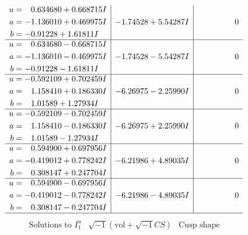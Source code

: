 \documentclass[1p]{elsarticle_modified}
\theoremstyle{definition}
\newcommand{\I}{\sqrt{-1}}
\begin{document}
$$\begin{array}{c|c|c}
\begin{aligned}
u &= \phantom{-}0.634680 + 0.668715 I \\
a &= -1.136010 + 0.469975 I \\
b &= -0.91228 + 1.61811 I\end{aligned}
 & -1.74528 + 5.54287 I & \phantom{-0.000000 } 0 \\ \hline\begin{aligned}
u &= \phantom{-}0.634680 - 0.668715 I \\
a &= -1.136010 - 0.469975 I \\
b &= -0.91228 - 1.61811 I\end{aligned}
 & -1.74528 - 5.54287 I & \phantom{-0.000000 } 0 \\ \hline\begin{aligned}
u &= -0.592109 + 0.702459 I \\
a &= \phantom{-}1.158410 + 0.186330 I \\
b &= \phantom{-}1.01589 + 1.27934 I\end{aligned}
 & -6.26975 - 2.25990 I & \phantom{-0.000000 } 0 \\ \hline\begin{aligned}
u &= -0.592109 - 0.702459 I \\
a &= \phantom{-}1.158410 - 0.186330 I \\
b &= \phantom{-}1.01589 - 1.27934 I\end{aligned}
 & -6.26975 + 2.25990 I & \phantom{-0.000000 } 0 \\ \hline\begin{aligned}
u &= \phantom{-}0.594900 + 0.697956 I \\
a &= -0.419012 + 0.778242 I \\
b &= \phantom{-}0.308147 + 0.247704 I\end{aligned}
 & -6.21986 + 4.89035 I & \phantom{-0.000000 } 0 \\ \hline\begin{aligned}
u &= \phantom{-}0.594900 - 0.697956 I \\
a &= -0.419012 - 0.778242 I \\
b &= \phantom{-}0.308147 - 0.247704 I\end{aligned}
 & -6.21986 - 4.89035 I & \phantom{-0.000000 } 0\\
 \hline 
 \end{array}$$\newpage$$\begin{array}{c|c|c}  
\text{Solutions to }I^u_{1}& \I (\text{vol} + \sqrt{-1}CS) & \text{Cusp shape}\\
 \hline 
\begin{aligned}

\end{aligned}
\end{array}$$
\end{document}
